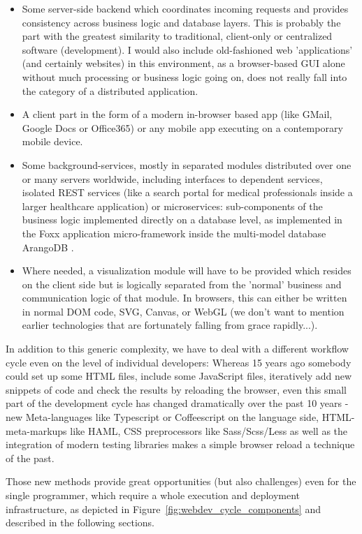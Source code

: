 \begin{itemize}
	\item Some server-side backend which coordinates incoming requests and provides consistency across business logic and database layers. This is probably the part with the greatest similarity to traditional, client-only or centralized software (development). I would also include old-fashioned web 'applications' (and certainly websites) in this environment, as a browser-based GUI alone without much processing or business logic going on, does not really fall into the category of a distributed application.
	\item A client part in the form of a modern in-browser based app (like GMail, Google Docs or Office365) or any mobile app executing on a contemporary mobile device.
	\item Some background-services, mostly in separated modules distributed over one or many servers worldwide, including interfaces to dependent services, isolated REST services (like a search portal for medical professionals inside a larger healthcare application) or microservices: sub-components of the business logic implemented directly on a database level, as implemented in the Foxx application micro-framework inside the multi-model database ArangoDB \citep{Foxx2014}.
	\item Where needed, a visualization module will have to be provided which resides on the client side but is logically separated from the 'normal' business and communication logic of that module. In browsers, this can either be written in normal DOM code, SVG, Canvas, or WebGL (we don't want to mention earlier technologies that are fortunately falling from grace rapidly...).
\end{itemize}

In addition to this generic complexity, we have to deal with a different workflow cycle even on the level of individual developers: Whereas 15 years ago somebody could set up some HTML files, include some JavaScript files, iteratively add new snippets of code and check the results by reloading the browser, even this small part of the development cycle has changed dramatically over the past 10 years - new Meta-languages like Typescript or Coffeescript on the language side, HTML-meta-markups like HAML, CSS preprocessors like Sass/Scss/Less as well as the integration of modern testing libraries makes a simple browser reload a technique of the past.

Those new methods provide great opportunities (but also challenges) even for the single programmer, which require a whole execution and deployment infrastructure, as depicted in Figure~\ref{fig:webdev_cycle_components} and described in the following sections.


